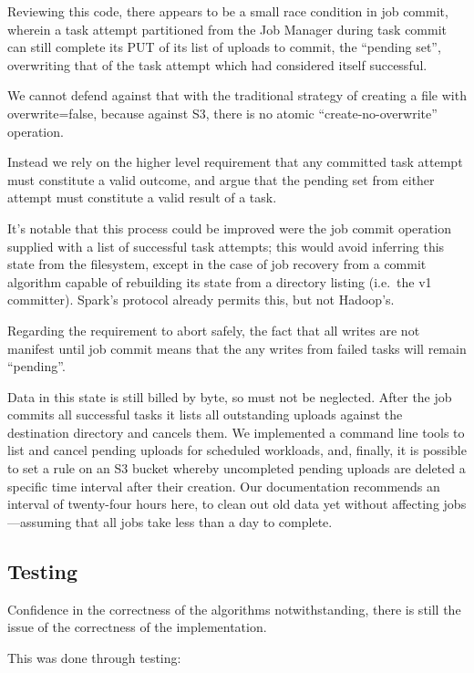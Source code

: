 \documentclass[conference]{IEEEtran}
\begin{document}
Reviewing this code, there appears to be a small race condition in job commit,
wherein a task attempt partitioned from the Job Manager during task commit
can still complete its PUT of its list of uploads to commit, the ``pending set'',
overwriting that of the task attempt which had considered itself successful.

We cannot defend against that with the traditional strategy of creating
a file with overwrite=false, because against S3, there is no atomic
``create-no-overwrite'' operation.

Instead we rely on the higher level requirement that any committed task attempt must
constitute a valid outcome, and argue that the pending set from either attempt
must constitute a valid result of a task.


It's notable that this process could be improved were the job commit
operation supplied with a list of successful task attempts;
this would avoid inferring this state from the filesystem, except in
the case of job recovery from a commit algorithm capable of
rebuilding its state from a directory listing (i.e.\ the v1 committer).
Spark's protocol already permits this, but not Hadoop's.

Regarding the requirement to abort safely, the fact that all writes are
not manifest until job commit means that the any writes from failed tasks
will remain ``pending''.

Data in this state is still billed by byte, so must not be neglected.
After the job commits all successful tasks it lists all outstanding
uploads against the destination directory and cancels them.
We implemented a command line tools to list and cancel pending uploads for
scheduled workloads, and, finally,
it is possible to set a rule on an S3 bucket whereby uncompleted
pending uploads are deleted a specific time interval after their creation.
Our documentation recommends an interval of twenty-four hours here, to
clean out old data yet without affecting jobs ---assuming that all jobs
take less than a day to complete.


\subsection{Testing}
\label{subsec:testing}

Confidence in the correctness of the algorithms notwithstanding, there
is still the issue of the correctness of the implementation.


This was done through testing:
\end{document}
